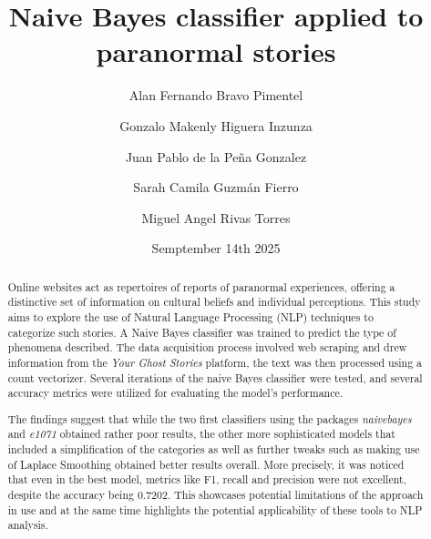 \documentclass[twocolumn]{article}
\title{Naive Bayes classifier applied to paranormal stories}
\author{
Alan Fernando Bravo Pimentel \and
Gonzalo Makenly Higuera Inzunza \and
Juan Pablo de la Peña Gonzalez \and
Sarah Camila Guzmán Fierro \and
Miguel Angel Rivas Torres
}
\date{Semptember 14th 2025}
\begin{document}
\maketitle

\begin{abstract}
Online websites act as repertoires of reports of paranormal experiences, offering a distinctive set of information on cultural beliefs and individual perceptions. This study aims to  explore the use of Natural Language Processing (NLP) techniques to categorize such stories. A Naive Bayes classifier was trained to predict the type of phenomena described. The data acquisition process involved web scraping and drew information from the \textit{Your Ghost Stories} platform, the text was then processed using a count vectorizer. Several iterations of the naive Bayes classifier were tested, and several accuracy metrics were utilized for evaluating the model's performance.  

The findings suggest that while the two first classifiers using the packages \textit{naivebayes} and \textit{e1071} obtained rather poor results, the other more sophisticated models that included a simplification of the categories as well as further tweaks such as making use of Laplace Smoothing obtained better results overall. More precisely, it was noticed that even in the best model, metrics like F1, recall and precision were not excellent, despite the accuracy being 0.7202. This showcases potential limitations of the approach in use and at the same time highlights the potential applicability of these tools to NLP analysis.


\end{abstract}
\end{document}
